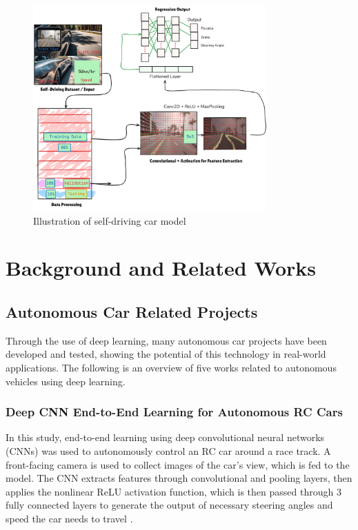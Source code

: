 \documentclass{article} %
\begin{document}
\begin{figure}[htbp]
    \centering
    \includegraphics[width=0.8\textwidth]{mif}
    \caption{Illustration of self-driving car model}
    \label{fig:my_label}
\end{figure}





\section{Background and Related Works}
\label{headings}

\subsection{Autonomous Car Related Projects}

Through the use of deep learning, many autonomous car projects have been developed and tested, showing the potential of this technology in real-world applications. 
The following is an overview of five works related to autonomous vehicles using deep learning.  


\subsubsection{Deep CNN End-to-End Learning for Autonomous RC Cars \citep{bhutta2023deep}}

 
In this study, end-to-end learning using deep convolutional neural networks (CNNs) was used to autonomously control an RC car around a race track. 
A front-facing camera is used to collect images of the car’s view, which is fed to the model. The CNN extracts features through convolutional and pooling layers, 
then applies the nonlinear ReLU activation function, which is then passed through 3 fully connected layers to generate the output of necessary steering angles 
and speed the car needs to travel \citep{bhutta2023deep}.
\end{document}
